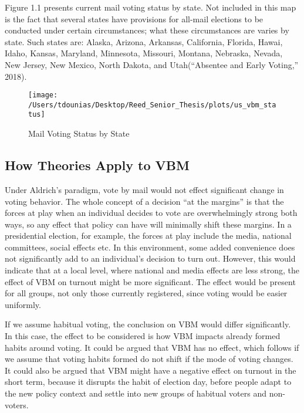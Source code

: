 \documentclass[12pt,twoside]{reedthesis}
\begin{document}
  Figure 1.1 presents current mail voting status by state. Not included in
  this map is the fact that several states have provisions for all-mail
  elections to be conducted under certain circumstances; what these
  circumstances are varies by state. Such states are: Alaska, Arizona,
  Arkansas, California, Florida, Hawai, Idaho, Kansas, Maryland,
  Minnesota, Missouri, Montana, Nebraska, Nevada, New Jersey, New Mexico,
  North Dakota, and Utah(``Absentee and Early Voting,'' 2018).
  
  \begin{figure}
  
  {\centering \texttt{[image: /Users/tdounias/Desktop/Reed\_Senior\_Thesis/plots/us\_vbm\_status]} 
  
  }
  
  \caption[Mail Voting Status by State]{Mail Voting Status by State}\label{fig:vbm us}
  \end{figure}
  
  \subsection{How Theories Apply to VBM}\label{how-theories-apply-to-vbm}
  
  Under Aldrich's paradigm, vote by mail would not effect significant
  change in voting behavior. The whole concept of a decision ``at the
  margins'' is that the forces at play when an individual decides to vote
  are overwhelmingly strong both ways, so any effect that policy can have
  will minimally shift these margins. In a presidential election, for
  example, the forces at play include the media, national committees,
  social effects etc. In this environment, some added convenience does not
  significantly add to an individual's decision to turn out. However, this
  would indicate that at a local level, where national and media effects
  are less strong, the effect of VBM on turnout might be more significant.
  The effect would be present for all groups, not only those currently
  registered, since voting would be easier uniformly.
  
  If we assume habitual voting, the conclusion on VBM would differ
  significantly. In this case, the effect to be considered is how VBM
  impacts already formed habits around voting. It could be argued that VBM
  has no effect, which follows if we assume that voting habits formed do
  not shift if the mode of voting changes. It could also be argued that
  VBM might have a negative effect on turnout in the short term, because
  it disrupts the habit of election day, before people adapt to the new
  policy context and settle into new groups of habitual voters and
  non-voters.
  
\end{document}
